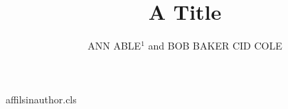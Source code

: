 \begin{filecontents*}[overwrite]{affilsinauthor.cls}
\def\affilfont{\small}
\def\author#1{\gdef\@author{#1}}
\def\affil#1{\gdef\@affil{#1}\ifx\@affil\@empty\else{\reset@font\affilfont\unskip,\ #1\vphantom{gy}\endgraf}\fi}\affil{}
\def\maketitle{\par{\Large\@title\par}{\noindent\@author\par}}
\end{filecontents*}
\documentclass{affilsinauthor}

\title{A Title}
\author{ANN ABLE$^1$ and BOB BAKER  CID COLE }
\maketitle
Body.

